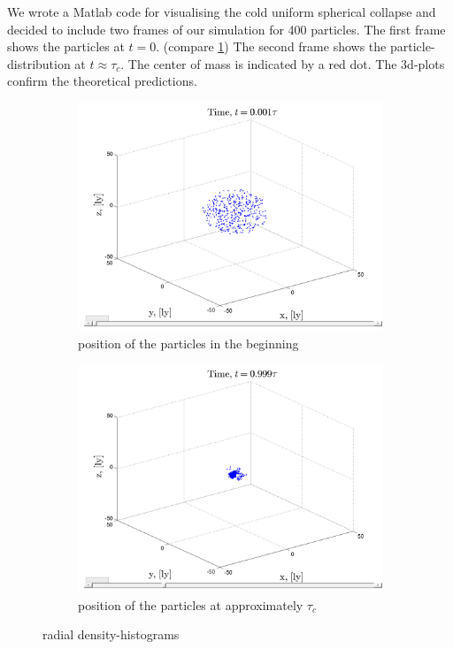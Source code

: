 \documentclass[10pt,a4paper]{article}
\begin{document}
We wrote a Matlab code for visualising the cold uniform spherical collapse and decided to include two frames of our simulation for 400 particles. The first frame shows the particles at $t=0$. (compare \ref{3dplot1}) The second frame shows the particle-distribution at $t\approx\tau_c$. The center of mass is indicated by a red dot. The 3d-plots confirm the theoretical predictions. 
\begin{figure}[h]
\begin{subfigure}{0.45\textwidth}
\centering
	\includegraphics[width=\textwidth]{3dplot1.png}
	\caption{position of the particles in the beginning \label{3dplot1}}
\end{subfigure}
\begin{subfigure}{0.45\textwidth}
\centering
\includegraphics[width=\textwidth]{3dplot3.png}
	\caption{position of the particles at approximately $\tau_c$ \label{3dplot3}}
\end{subfigure}
\caption{radial density-histograms}
\end{figure}
\end{document}

